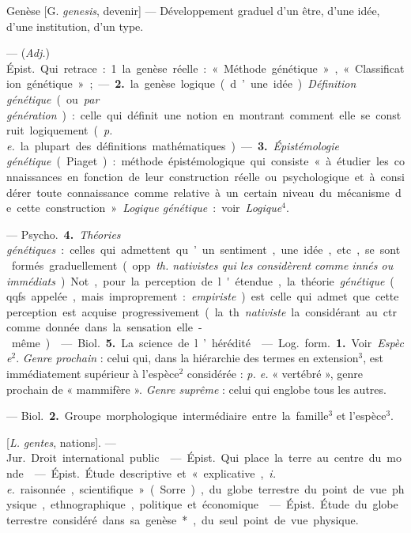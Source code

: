 \begin{itemize}[leftmargin=1cm, label=, itemsep=1pt]
\ib{}Genèse [G. {\it genesis}, devenir] — Développement graduel d’un être,
d’une idée, d’une institution, d’un type.

 — ({\it Adj.}) \si{Épist.} Qui retrace : 1. la genèse réelle :
« Méthode génétique », « Classification génétique » ; — {\bf 2.} la genèse
logique (d’une idée). {\it Définition génétique} (ou {\it par génération}) :
celle qui définit une notion en montrant comment elle se construit
logiquement ({\it p. e.} la plupart
des définitions mathématiques). — {\bf 3.} {\it Épistémologie génétique}
(Piaget) : méthode épistémologique qui consiste « à étudier les connaissances
en fonction de leur construction réelle ou psychologique et à considérer
toute connaissance comme relative à un certain niveau du mécanisme de cette
construction ». {\it Logique génétique} : voir {\it Logique}$^4$.

— \si{Psycho.} {\bf 4.} {\it Théories génétiques} : celles qui admettent
qu’un sentiment, une idée, etc., se sont formés graduellement (opp.
{\it th. nativistes qui les considèrent comme innés ou immédiats}). Not.,
pour la perception de l'étendue, la théorie {\it génétique} (qqfs. appelée,
mais improprement : {\it empiriste}) est celle qui admet que cette perception
est acquise progressivement (la th. {\it nativiste} la considérant au ctr.
comme donnée dans la sensation elle-même).

 — \si{Biol.} {\bf 5.} La science de l’hérédité.

 — \si{Log.} \si{form.} {\bf 1.} Voir {\it Espèce}$^2$.
{\it Genre prochain} : celui qui, dans la hiérarchie des termes en
extension$^3$, est immédiatement supérieur à l’espèce$^2$ considérée :
{\it p. e.} « vertébré », genre prochain de « mammifère ».
{\it Genre suprême} : celui qui englobe tous les autres.

— \si{Biol.} {\bf 2.} Groupe morphologique intermédiaire entre la famille$^3$
et l'espèce$^3$.

 [{\it L.} {\it gentes}, nations].
— \si{Jur.} Droit international public.

 — \si{Épist.} Qui place la terre au centre du monde.

 — \si{Épist.} Étude descriptive et « explicative, {\it i. e.}
raisonnée, scientifique » (Sorre), du globe terrestre du point de vue
physique, ethnographique, politique et économique.

 — \si{Épist.} Étude du globe terrestre considéré dans sa
genèse*, du seul point de vue physique.


\end{itemize}
